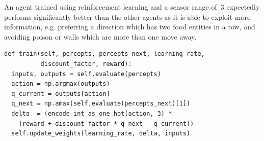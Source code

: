 \documentclass[paper=a4, fontsize=10pt]{scrartcl}
\begin{document}
\begin{multicols}{2}
An agent trained using reinforcement learning and a sensor range of~3 expectedly performs significantly better than the other agents as it is able to exploit more information, e.g. preferring a direction which has two food entities in a row, and avoiding poison or walls which are more than one move away.

{
\footnotesize
\begin{verbatim}
def train(self, percepts, percepts_next, learning_rate,
          discount_factor, reward):
  inputs, outputs = self.evaluate(percepts)
  action = np.argmax(outputs)
  q_current = outputs[action]
  q_next = np.amax(self.evaluate(percepts_next)[1])
  delta  = (encode_int_as_one_hot(action, 3) *
    (reward + discount_factor * q_next - q_current))
  self.update_weights(learning_rate, delta, inputs)
\end{verbatim}
\vspace*{-3mm}
\label{fig:code_delta_reinforcement}
}

\end{multicols}
\end{document}

